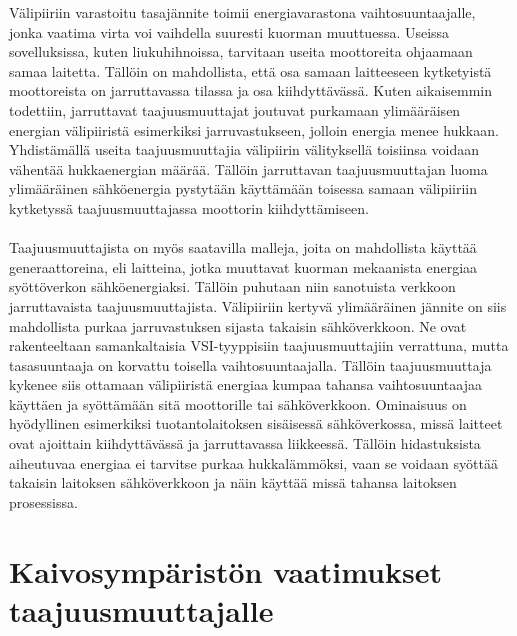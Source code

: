 \documentclass[finnish,12pt,a4paper,pdftex,elec,utf8]{aaltothesis}
\begin{document}
\noindent
Välipiiriin varastoitu tasajännite toimii energiavarastona vaihtosuuntaajalle, jonka vaatima virta voi vaihdella suuresti kuorman muuttuessa. Useissa sovelluksissa, kuten liukuhihnoissa, tarvitaan useita moottoreita ohjaamaan samaa laitetta. Tällöin on mahdollista, että osa samaan laitteeseen kytketyistä moottoreista on jarruttavassa tilassa ja osa kiihdyttävässä. Kuten aikaisemmin todettiin, jarruttavat taajuusmuuttajat joutuvat purkamaan ylimääräisen energian välipiiristä esimerkiksi jarruvastukseen, jolloin energia menee hukkaan. Yhdistämällä useita taajuusmuuttajia välipiirin välityksellä toisiinsa voidaan vähentää hukkaenergian määrää. Tällöin jarruttavan taajuusmuuttajan luoma ylimääräinen sähköenergia pystytään käyttämään toisessa samaan välipiiriin kytketyssä taajuusmuuttajassa moottorin kiihdyttämiseen. \cite{ABBtechnicalguide}
\\\\
Taajuusmuuttajista on myös saatavilla malleja, joita on mahdollista käyttää generaattoreina, eli laitteina, jotka muuttavat kuorman mekaanista energiaa syöttöverkon sähköenergiaksi. Tällöin puhutaan niin sanotuista verkkoon jarruttavaista taajuusmuuttajista. Välipiiriin kertyvä ylimääräinen jännite on siis mahdollista purkaa jarruvastuksen sijasta takaisin sähköverkkoon. Ne ovat rakenteeltaan samankaltaisia VSI-tyyppisiin taajuusmuuttajiin verrattuna, mutta tasasuuntaaja on korvattu toisella vaihtosuuntaajalla. Tällöin taajuusmuuttaja kykenee siis ottamaan välipiiristä energiaa kumpaa tahansa vaihtosuuntaajaa käyttäen ja syöttämään sitä moottorille tai sähköverkkoon. Ominaisuus on hyödyllinen esimerkiksi tuotantolaitoksen sisäisessä sähköverkossa, missä laitteet ovat ajoittain kiihdyttävässä ja jarruttavassa liikkeessä. Tällöin hidastuksista aiheutuvaa energiaa ei tarvitse purkaa hukkalämmöksi, vaan se voidaan syöttää takaisin laitoksen sähköverkkoon ja näin käyttää missä tahansa laitoksen prosessissa. \cite{ABBtechnicalguide}




\clearpage

\section{{\large Kaivosympäristön vaatimukset taajuusmuuttajalle}}
\end{document}
